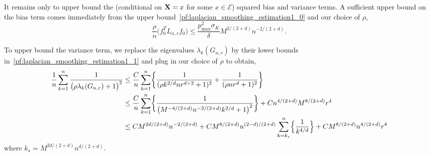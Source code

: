 \documentclass[twoside]{article}
\newcommand{\1}{\mathbf{1}}
\newcommand{\Lap}{L}
\newcommand{\mc}[1]{\mathcal{#1}}
\theoremstyle{definition}
\theoremstyle{remark}
\begin{document}
It remains only to upper bound the (conditional on ${\bf X} = x$ for some $x \in \mc{E}$) squared bias and variance terms. A sufficient upper bound on the bias term comes immediately from the upper bound~\ref{pf:laplacian_smoothing_estimation1_0} and our choice of $\rho$,
\begin{equation}
\label{pf:laplacian_smoothing_estimation1_2.5}
\frac{\rho}{n} \bigl(f_0^T \Lap_{{n,r}} f_0\bigr) \leq \frac{p_{\max}^2 \sigma_K}{\delta} M^{2/(2+d)} n^{-2/(2 + d)}.
\end{equation}

To upper bound the variance term, we replace the eigenvalues $\lambda_k(G_{n,r})$ by their lower bounds in~\ref{pf:laplacian_smoothing_estimation1_1} and plug in our choice of $\rho$ to obtain,
\begin{align}
\frac{1}{n}\sum_{k = 1}^{n} \frac{1}{\bigl(\rho \lambda_{k}(G_{n,r}) + 1\bigr)^2} & \leq \frac{C}{n}\sum_{k = 1}^{n} \biggl\{\frac{1}{(\rho k^{2/d} n r^{d + 2} + 1)^2} + \frac{1}{(\rho n r^{d} + 1)^2} \biggr\} \nonumber \\
& \leq \frac{C}{n}\sum_{k = 1}^{n} \biggl\{\frac{1}{\bigl(M^{-4/(2 + d)}n^{-2/(2+d)}k^{2/d} + 1\bigr)^2}\biggr\} + Cn^{4/(2 + d)}M^{8/(2+d)}r^{4} \nonumber \\
& \leq CM^{2d/(2 + d)} n^{-2/(2 + d)} + CM^{8/(2 + d)}n^{(2 - d)/(2 + d)} \sum_{k = k_{\star}}^{n} \Bigl\{\frac{1}{k^{4/d}}\Bigr\}  + CM^{8/(2 + d)}n^{4/(2 + d)}r^4 \label{pf:laplacian_smoothing_estimation1_2.25}
\end{align}
where $k_{\star} = M^{2d/(2 + d)}n^{d/(2 + d)}$.  
\end{document}
